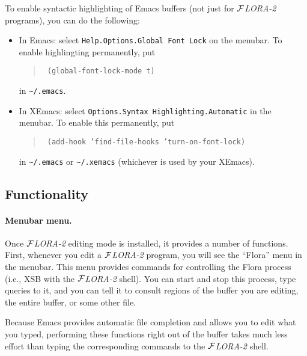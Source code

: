 \documentclass[11pt]{article}
\newcommand{\FLORA}{{\mbox{${\cal F}${\small\it LORA}\rm\emph{-2}}}\xspace}
\begin{document}
To enable syntactic highlighting of Emacs buffers (not just for \FLORA
programs), you can do the following:
\begin{itemize}
  \item  {\sf In Emacs:} select {\tt Help.Options.Global Font Lock} on
    the menubar.  To enable highlingting permanently, put 
    \begin{quote}
      \tt
      (global-font-lock-mode t)
    \end{quote}
    in \verb|~/.emacs|.
  \item {\sf In XEmacs:} select {\tt Options.Syntax
        Highlighting.Automatic} in the menubar. To enable this permanently, put
      \begin{quote}
        \tt
        (add-hook 'find-file-hooks 'turn-on-font-lock)
      \end{quote}
      in \verb|~/.emacs| or \verb|~/.xemacs| (whichever is used by your
      XEmacs).
\end{itemize}


\subsection{Functionality}


\paragraph{Menubar menu.}
Once \FLORA editing mode is installed, it provides a number of functions.
First, whenever you edit a \FLORA program, you will see the ``Flora'' menu
in the menubar. This menu provides commands for controlling the Flora
process (i.e., XSB with the \FLORA shell). You can start and stop
this process, type queries to it, and you can tell it to consult regions of
the buffer you are editing, the entire buffer, or some other file.

Because Emacs provides automatic file completion and allows you to edit
what you typed, performing these functions right out of the buffer takes
much less effort than typing the corresponding commands to the \FLORA
shell.
\end{document}
